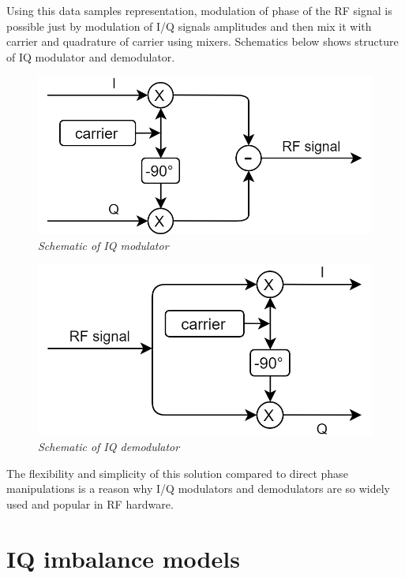 \documentclass[en,printmode]{mgr}
\begin{document}
		Using this data samples representation, modulation of phase of the RF signal is possible just by modulation of
		I/Q signals amplitudes and then mix it with carrier and quadrature of carrier using mixers. Schematics below 
		shows structure of IQ modulator and demodulator.
		
		\begin{figure}[!htb]
    		\centering
   			\includegraphics[width=\textwidth]{images/iqmod.png}
    		\caption{\textit{Schematic of IQ modulator}}
    		\label{fig:polarplot}
		\end{figure}
		
		\begin{figure}[!htb]
    		\centering
   			\includegraphics[width=\textwidth]{images/iqdemod.png}
    		\caption{\textit{Schematic of IQ demodulator}}
    		\label{fig:polarplot}
		\end{figure}
		\newpage
		The flexibility and simplicity of this solution compared to direct phase manipulations
		is a reason why I/Q modulators and demodulators are so widely used and popular in RF hardware.
		

	\section{IQ imbalance models}
\end{document}
